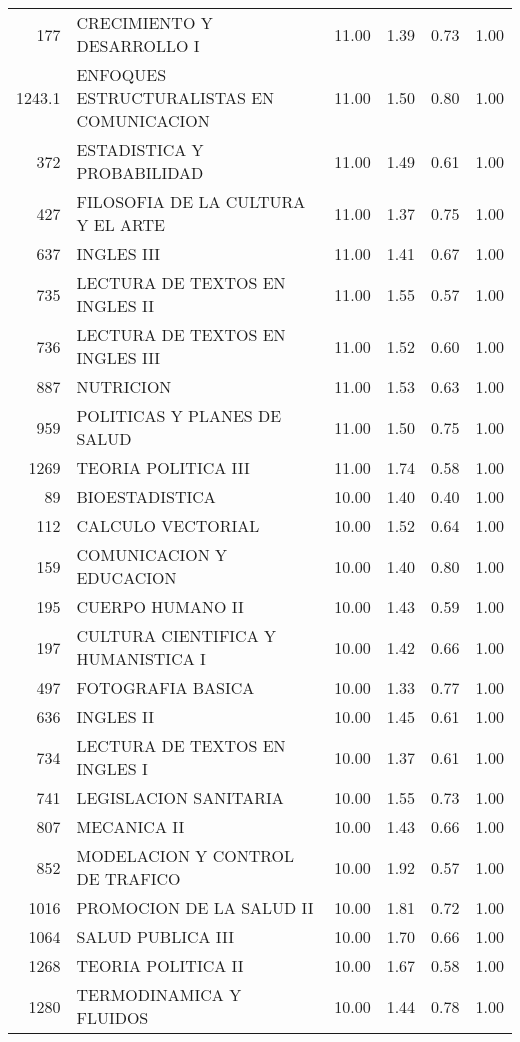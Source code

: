 \begin{table}[ht]
\begin{tabular}{rlrrrr}
  177 & CRECIMIENTO Y DESARROLLO I & 11.00 & 1.39 & 0.73 & 1.00 \\ 
  1243.1 & ENFOQUES ESTRUCTURALISTAS EN COMUNICACION & 11.00 & 1.50 & 0.80 & 1.00 \\ 
  372 & ESTADISTICA Y PROBABILIDAD & 11.00 & 1.49 & 0.61 & 1.00 \\ 
  427 & FILOSOFIA DE LA CULTURA Y EL ARTE & 11.00 & 1.37 & 0.75 & 1.00 \\ 
  637 & INGLES III & 11.00 & 1.41 & 0.67 & 1.00 \\ 
  735 & LECTURA DE TEXTOS EN INGLES II & 11.00 & 1.55 & 0.57 & 1.00 \\ 
  736 & LECTURA DE TEXTOS EN INGLES III & 11.00 & 1.52 & 0.60 & 1.00 \\ 
  887 & NUTRICION & 11.00 & 1.53 & 0.63 & 1.00 \\ 
  959 & POLITICAS Y PLANES DE SALUD & 11.00 & 1.50 & 0.75 & 1.00 \\ 
  1269 & TEORIA POLITICA III & 11.00 & 1.74 & 0.58 & 1.00 \\ 
  89 & BIOESTADISTICA & 10.00 & 1.40 & 0.40 & 1.00 \\ 
  112 & CALCULO VECTORIAL & 10.00 & 1.52 & 0.64 & 1.00 \\ 
  159 & COMUNICACION Y EDUCACION & 10.00 & 1.40 & 0.80 & 1.00 \\ 
  195 & CUERPO HUMANO II & 10.00 & 1.43 & 0.59 & 1.00 \\ 
  197 & CULTURA CIENTIFICA Y HUMANISTICA I & 10.00 & 1.42 & 0.66 & 1.00 \\ 
  497 & FOTOGRAFIA BASICA & 10.00 & 1.33 & 0.77 & 1.00 \\ 
  636 & INGLES II & 10.00 & 1.45 & 0.61 & 1.00 \\ 
  734 & LECTURA DE TEXTOS EN INGLES I & 10.00 & 1.37 & 0.61 & 1.00 \\ 
  741 & LEGISLACION SANITARIA & 10.00 & 1.55 & 0.73 & 1.00 \\ 
  807 & MECANICA II & 10.00 & 1.43 & 0.66 & 1.00 \\ 
  852 & MODELACION Y CONTROL DE TRAFICO & 10.00 & 1.92 & 0.57 & 1.00 \\ 
  1016 & PROMOCION DE LA SALUD II & 10.00 & 1.81 & 0.72 & 1.00 \\ 
  1064 & SALUD PUBLICA III & 10.00 & 1.70 & 0.66 & 1.00 \\ 
  1268 & TEORIA POLITICA II & 10.00 & 1.67 & 0.58 & 1.00 \\ 
  1280 & TERMODINAMICA Y FLUIDOS & 10.00 & 1.44 & 0.78 & 1.00 \\ 

\end{tabular}
\end{table}
